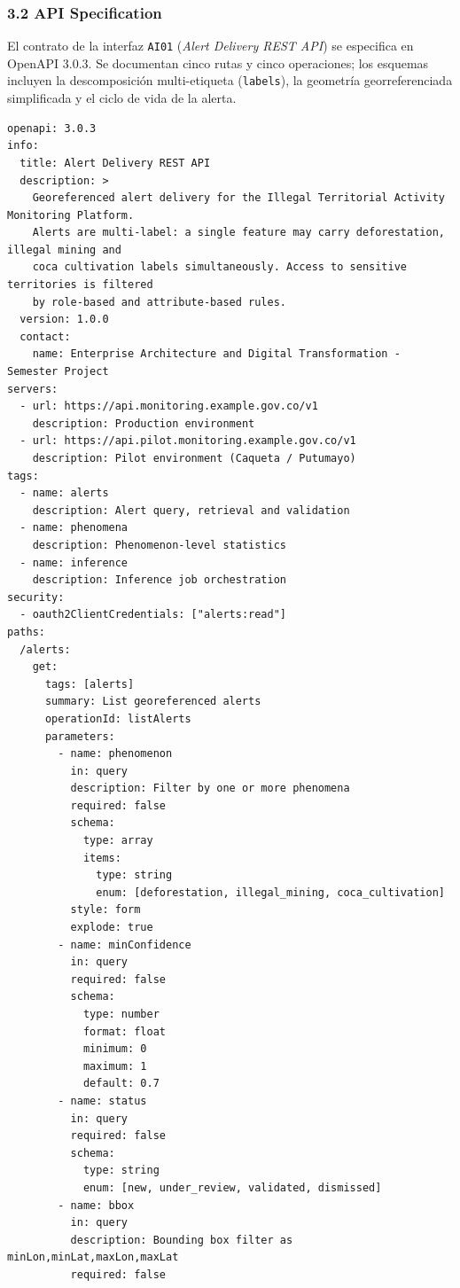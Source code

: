 \documentclass{article}
\begin{document}
\subsubsection{3.2 API Specification}

El contrato de la interfaz \texttt{AI01} (\emph{Alert Delivery REST API}) se especifica en OpenAPI 3.0.3. Se documentan cinco rutas y cinco operaciones; los esquemas incluyen la descomposición multi-etiqueta (\texttt{labels}), la geometría georreferenciada simplificada y el ciclo de vida de la alerta.

\begin{lstlisting}
openapi: 3.0.3
info:
  title: Alert Delivery REST API
  description: >
    Georeferenced alert delivery for the Illegal Territorial Activity Monitoring Platform.
    Alerts are multi-label: a single feature may carry deforestation, illegal mining and
    coca cultivation labels simultaneously. Access to sensitive territories is filtered
    by role-based and attribute-based rules.
  version: 1.0.0
  contact:
    name: Enterprise Architecture and Digital Transformation - Semester Project
servers:
  - url: https://api.monitoring.example.gov.co/v1
    description: Production environment
  - url: https://api.pilot.monitoring.example.gov.co/v1
    description: Pilot environment (Caqueta / Putumayo)
tags:
  - name: alerts
    description: Alert query, retrieval and validation
  - name: phenomena
    description: Phenomenon-level statistics
  - name: inference
    description: Inference job orchestration
security:
  - oauth2ClientCredentials: ["alerts:read"]
paths:
  /alerts:
    get:
      tags: [alerts]
      summary: List georeferenced alerts
      operationId: listAlerts
      parameters:
        - name: phenomenon
          in: query
          description: Filter by one or more phenomena
          required: false
          schema:
            type: array
            items:
              type: string
              enum: [deforestation, illegal_mining, coca_cultivation]
          style: form
          explode: true
        - name: minConfidence
          in: query
          required: false
          schema:
            type: number
            format: float
            minimum: 0
            maximum: 1
            default: 0.7
        - name: status
          in: query
          required: false
          schema:
            type: string
            enum: [new, under_review, validated, dismissed]
        - name: bbox
          in: query
          description: Bounding box filter as minLon,minLat,maxLon,maxLat
          required: false

\end{lstlisting}
\end{document}
